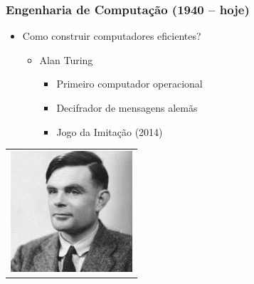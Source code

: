 \documentclass[aspectratio=169]{beamer}
\begin{document}
	\begin{frame}
		\frametitle{Engenharia de Computação (1940 – hoje)}
		\begin{itemize}
			\item Como construir computadores eficientes?
			\begin{itemize}
				\item Alan Turing
				\begin{itemize}
					\item Primeiro computador operacional
					\item Decifrador de mensagens alemãs
					\item Jogo da Imitação (2014)

				\end{itemize}
			\end{itemize}
		\end{itemize}
		
		\begin{table}
			\centering
			\begin{tabular}{c}				
				\includegraphics[height=4.5cm, keepaspectratio]{../figs/cap01/turing.png} \\		
				
			\end{tabular}
		\end{table}
	\end{frame}
\end{document}

